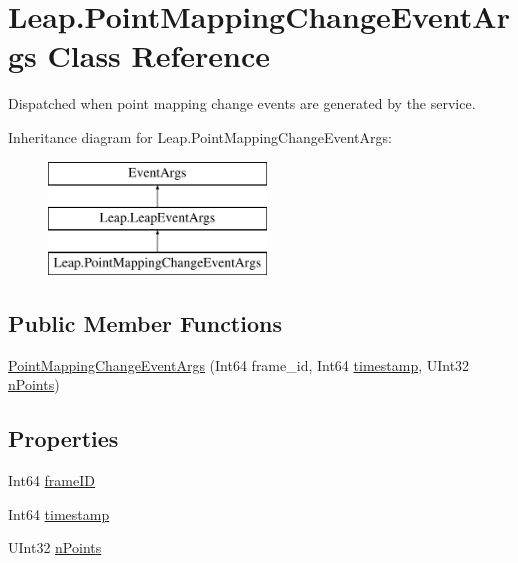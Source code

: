 \hypertarget{class_leap_1_1_point_mapping_change_event_args}{}\section{Leap.\+Point\+Mapping\+Change\+Event\+Args Class Reference}
\label{class_leap_1_1_point_mapping_change_event_args}


Dispatched when point mapping change events are generated by the service.  


Inheritance diagram for Leap.\+Point\+Mapping\+Change\+Event\+Args\+:\begin{figure}[H]
\begin{center}
\leavevmode
\includegraphics[height=3.000000cm]{class_leap_1_1_point_mapping_change_event_args}
\end{center}
\end{figure}
\subsection*{Public Member Functions}
\begin{DoxyCompactItemize}
\item 
\mbox{\hyperlink{class_leap_1_1_point_mapping_change_event_args_a085441b330a5a5913c9be1939067bddf}{Point\+Mapping\+Change\+Event\+Args}} (Int64 frame\+\_\+id, Int64 \mbox{\hyperlink{class_leap_1_1_point_mapping_change_event_args_ade4a64a8fea36bf357d6da923ca621b7}{timestamp}}, U\+Int32 \mbox{\hyperlink{class_leap_1_1_point_mapping_change_event_args_a8d2641c938fa1dacbc9719c5d51e17bb}{n\+Points}})
\end{DoxyCompactItemize}
\subsection*{Properties}
\begin{DoxyCompactItemize}
\item 
Int64 \mbox{\hyperlink{class_leap_1_1_point_mapping_change_event_args_a42b7463e4dd8038f1c365a1fa069733a}{frame\+ID}}
\item 
Int64 \mbox{\hyperlink{class_leap_1_1_point_mapping_change_event_args_ade4a64a8fea36bf357d6da923ca621b7}{timestamp}}
\item 
U\+Int32 \mbox{\hyperlink{class_leap_1_1_point_mapping_change_event_args_a8d2641c938fa1dacbc9719c5d51e17bb}{n\+Points}}
\end{DoxyCompactItemize}


